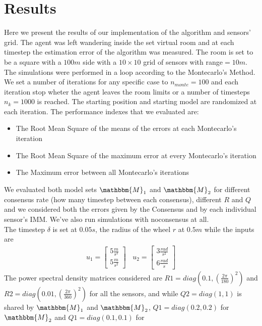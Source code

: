 \documentclass[twocolumn]{article}
\begin{document}
\section*{Results}
Here we present the results of our implementation of the algorithm and sensors' grid. The agent was left wandering inside the set virtual room 
and at each timestep the estimation error of the algorithm was measured. The room is set to be a square with a $100m$ side with a $10\times 10$ 
grid of sensors with range$=10m$. 
\\
The simulations were performed in a loop according to the Montecarlo's Method. We set a number of iterations for any specific case to 
$n_{monte}=100$ and each iteration stop wheter the agent leaves the room limits or a number of timesteps $n_{k}=1000$ is reached. The starting
 position and starting model are randomized at each iteration.
The performance indexes that we evaluated are:
\begin{itemize}
    \item The Root Mean Square of the means of the errors at each Montecarlo's iteration
    \item The Root Mean Square of the maximum error at every Montecarlo's iteration
    \item The Maximum error between all Montecarlo's iterations
\end{itemize}
We evaluated both model sets $\mathbbm{M}_{1}$ and $\mathbbm{M}_{2}$ for different consensus rate (how many timestep between each consensus), 
different $R$ and $Q$ and we considered both the errors given by the Consensus and by each individual sensor's IMM. We've also run simulations 
with noconsensus at all.
\\
The timestep $\delta$ is set at $0.05s$, the radius of the wheel $r$ at $0.5m$ while the inputs are
\begin{align*}
    u_{1}=\begin{bmatrix}
        5\frac{m}{s^{2}} \\5\frac{m}{s^{2}}
    \end{bmatrix}\ \ \ \ 
    u_{2}=\begin{bmatrix}
        3\frac{rad}{s^{2}} \\6\frac{rad}{s}
    \end{bmatrix}
\end{align*}
The power spectral density matrices considered are $R1=diag(0.1,(\frac{2\pi}{180})^{2})$ and $R2=diag(0.01,(\frac{2\pi}{360})^{2})$ for all the sensors, 
and while $Q2=diag(1,1)$ is shared by $\mathbbm{M}_{1}$ and $\mathbbm{M}_{2}$, $Q1=diag(0.2,0.2)$ for $\mathbbm{M}_{2}$ and $Q1=diag(0.1,0.1)$ for 
\end{document}
